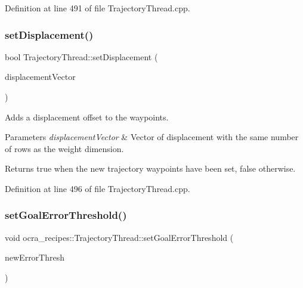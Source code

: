 Definition at line 491 of file Trajectory\+Thread.\+cpp.

\hypertarget{classocra__recipes_1_1TrajectoryThread_ab068cd5ad8d3b000c0af32311c113141}{}\label{classocra__recipes_1_1TrajectoryThread_ab068cd5ad8d3b000c0af32311c113141} 
\subsubsection{\texorpdfstring{set\+Displacement()}{setDisplacement()}\hspace{0.1cm}{\footnotesize\ttfamily [2/2]}}
{\footnotesize\ttfamily bool Trajectory\+Thread\+::set\+Displacement (\begin{DoxyParamCaption}\item[{const Eigen\+::\+Vector\+Xd \&}]{displacement\+Vector }\end{DoxyParamCaption})}

Adds a displacement offset to the waypoints.


\begin{DoxyParams}{Parameters}
{\em displacement\+Vector} & Vector of displacement with the same number of rows as the weight dimension.\\
\hline
\end{DoxyParams}
\begin{DoxyReturn}{Returns}
true when the new trajectory waypoints have been set, false otherwise. 
\end{DoxyReturn}


Definition at line 496 of file Trajectory\+Thread.\+cpp.

\hypertarget{classocra__recipes_1_1TrajectoryThread_a78eb7665f07bbdbd79bbc4553fb9d0e3}{}\label{classocra__recipes_1_1TrajectoryThread_a78eb7665f07bbdbd79bbc4553fb9d0e3} 
\subsubsection{\texorpdfstring{set\+Goal\+Error\+Threshold()}{setGoalErrorThreshold()}}
{\footnotesize\ttfamily void ocra\+\_\+recipes\+::\+Trajectory\+Thread\+::set\+Goal\+Error\+Threshold (\begin{DoxyParamCaption}\item[{const double}]{new\+Error\+Thresh }\end{DoxyParamCaption})\hspace{0.3cm}{\ttfamily [inline]}}

